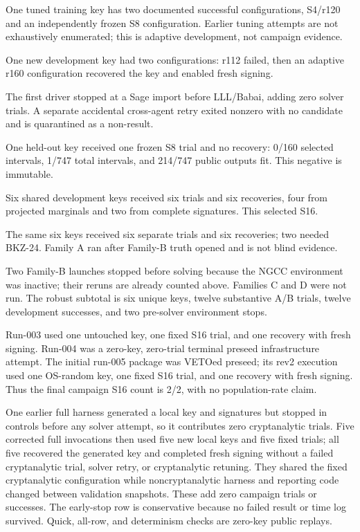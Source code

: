 \documentclass[10pt,a4paper]{article}
\begin{document}
\begin{description}[leftmargin=0.25in,style=nextline,itemsep=2pt]
\item[Original projected development.]
One tuned training key has two documented successful configurations, S4/r120
and an independently frozen S8 configuration.  Earlier tuning attempts are not
exhaustively enumerated; this is adaptive development, not campaign evidence.
\item[Fresh adaptive S8 development.]
One new development key had two configurations: r112 failed, then an adaptive
r160 configuration recovered the key and enabled fresh signing.
\item[Run-002 infrastructure and quarantine.]
The first driver stopped at a Sage import before LLL/Babai, adding zero solver
trials.  A separate accidental cross-agent retry exited nonzero with no
candidate and is quarantined as a non-result.
\item[Untouched run-002.]
One held-out key received one frozen S8 trial and no recovery: 0/160 selected
intervals, 1/747 total intervals, and 214/747 public outputs fit.  This negative
is immutable.
\item[Robust Family B development.]
Six shared development keys received six trials and six recoveries, four from
projected marginals and two from complete signatures.  This selected S16.
\item[Robust Family A development.]
The same six keys received six separate trials and six recoveries; two needed
BKZ-24.  Family A ran after Family-B truth opened and is not blind evidence.
\item[Robust environment stops and unused families.]
Two Family-B launches stopped before solving because the NGCC environment was
inactive; their reruns are already counted above.  Families C and D were not
run.  The robust subtotal is six unique keys, twelve substantive A/B trials,
twelve development successes, and two pre-solver environment stops.
\item[Final campaign.]
Run-003 used one untouched key, one fixed S16 trial, and one recovery with fresh
signing.  Run-004 was a zero-key, zero-trial terminal preseed infrastructure
attempt.  The initial run-005 package was VETOed preseed; its rev2 execution
used one OS-random key, one fixed S16 trial, and one recovery with fresh
signing.  Thus the final campaign S16 count is 2/2, with no population-rate
claim.
\item[Public-package validation.]
One earlier full harness generated a local key and signatures but stopped in
controls before any solver attempt, so it contributes zero cryptanalytic
trials.  Five corrected full invocations then used five new local keys and
five fixed trials; all five recovered the generated key and completed fresh
signing without a failed cryptanalytic trial, solver retry, or cryptanalytic
retuning.  They shared the fixed cryptanalytic configuration while
noncryptanalytic harness and reporting code changed between validation
snapshots.  These add zero campaign trials or successes.  The early-stop row
is conservative because no failed result or time log survived.  Quick,
all-row, and determinism checks are zero-key public replays.
\end{description}
\end{document}
